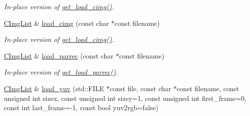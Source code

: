\begin{DoxyCompactItemize}
\begin{DoxyCompactList}\small\item\em In-\/place version of \hyperlink{structcimg__library_1_1_c_img_list_a1dc19bf70de1c3e2144d88a51aa135cf}{get\_\-load\_\-cimg()}. \item\end{DoxyCompactList}\item 
\hypertarget{structcimg__library_1_1_c_img_list_a2760a04dfde9a68e20a7a391793c5eee}{
\hyperlink{structcimg__library_1_1_c_img_list}{CImgList} \& \hyperlink{structcimg__library_1_1_c_img_list_a2760a04dfde9a68e20a7a391793c5eee}{load\_\-cimg} (const char $\ast$const filename)}
\label{structcimg__library_1_1_c_img_list_a2760a04dfde9a68e20a7a391793c5eee}

\begin{DoxyCompactList}\small\item\em In-\/place version of \hyperlink{structcimg__library_1_1_c_img_list_a1dc19bf70de1c3e2144d88a51aa135cf}{get\_\-load\_\-cimg()}. \item\end{DoxyCompactList}\item 
\hypertarget{structcimg__library_1_1_c_img_list_a6efa0324a9075a6a64c3a8a05f454867}{
\hyperlink{structcimg__library_1_1_c_img_list}{CImgList} \& \hyperlink{structcimg__library_1_1_c_img_list_a6efa0324a9075a6a64c3a8a05f454867}{load\_\-parrec} (const char $\ast$const filename)}
\label{structcimg__library_1_1_c_img_list_a6efa0324a9075a6a64c3a8a05f454867}

\begin{DoxyCompactList}\small\item\em In-\/place version of \hyperlink{structcimg__library_1_1_c_img_list_a35ef628a9224432225587787212a7c82}{get\_\-load\_\-parrec()}. \item\end{DoxyCompactList}\item 
\hypertarget{structcimg__library_1_1_c_img_list_affe0c198e2e48c1b12b285f3839b6507}{
\hyperlink{structcimg__library_1_1_c_img_list}{CImgList} \& \hyperlink{structcimg__library_1_1_c_img_list_affe0c198e2e48c1b12b285f3839b6507}{load\_\-yuv} (std::FILE $\ast$const file, const char $\ast$const filename, const unsigned int sizex, const unsigned int sizey=1, const unsigned int first\_\-frame=0, const int last\_\-frame=-\/1, const bool yuv2rgb=false)}
\label{structcimg__library_1_1_c_img_list_affe0c198e2e48c1b12b285f3839b6507}


\end{DoxyCompactItemize}
